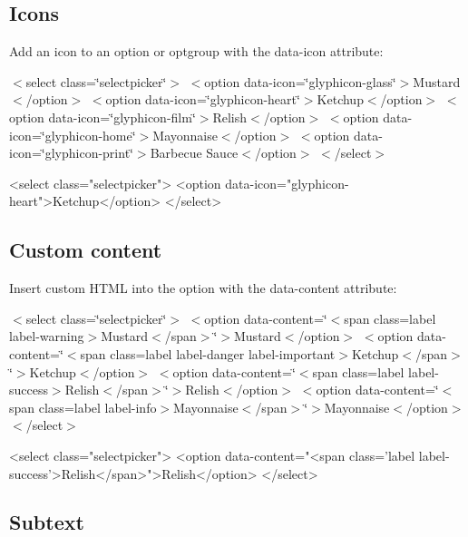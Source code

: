 \subsection*{Icons}

Add an icon to an option or optgroup with the {\ttfamily data-\/icon} attribute\+:

 $<$select class=\char`\"{}selectpicker\char`\"{}$>$ $<$option data-\/icon=\char`\"{}glyphicon-\/glass\char`\"{}$>$Mustard$<$/option$>$ $<$option data-\/icon=\char`\"{}glyphicon-\/heart\char`\"{}$>$Ketchup$<$/option$>$ $<$option data-\/icon=\char`\"{}glyphicon-\/film\char`\"{}$>$Relish$<$/option$>$ $<$option data-\/icon=\char`\"{}glyphicon-\/home\char`\"{}$>$Mayonnaise$<$/option$>$ $<$option data-\/icon=\char`\"{}glyphicon-\/print\char`\"{}$>$Barbecue Sauce$<$/option$>$ $<$/select$>$ 


\begin{DoxyCode}
<select class="selectpicker">
  <option data-icon="glyphicon-heart">Ketchup</option>
</select>
\end{DoxyCode}


\subsection*{Custom content}

Insert custom H\+T\+ML into the option with the {\ttfamily data-\/content} attribute\+:

 $<$select class=\char`\"{}selectpicker\char`\"{}$>$ $<$option data-\/content=\char`\"{}$<$span class=\textquotesingle{}label label-\/warning\textquotesingle{}$>$\+Mustard$<$/span$>$\char`\"{}$>$Mustard$<$/option$>$ $<$option data-\/content=\char`\"{}$<$span class=\textquotesingle{}label label-\/danger label-\/important\textquotesingle{}$>$\+Ketchup$<$/span$>$\char`\"{}$>$Ketchup$<$/option$>$ $<$option data-\/content=\char`\"{}$<$span class=\textquotesingle{}label label-\/success\textquotesingle{}$>$\+Relish$<$/span$>$\char`\"{}$>$Relish$<$/option$>$ $<$option data-\/content=\char`\"{}$<$span class=\textquotesingle{}label label-\/info\textquotesingle{}$>$\+Mayonnaise$<$/span$>$\char`\"{}$>$Mayonnaise$<$/option$>$ $<$/select$>$ 


\begin{DoxyCode}
<select class="selectpicker">
  <option data-content="<span class='label label-success'>Relish</span>">Relish</option>
</select>
\end{DoxyCode}


\subsection*{Subtext}

